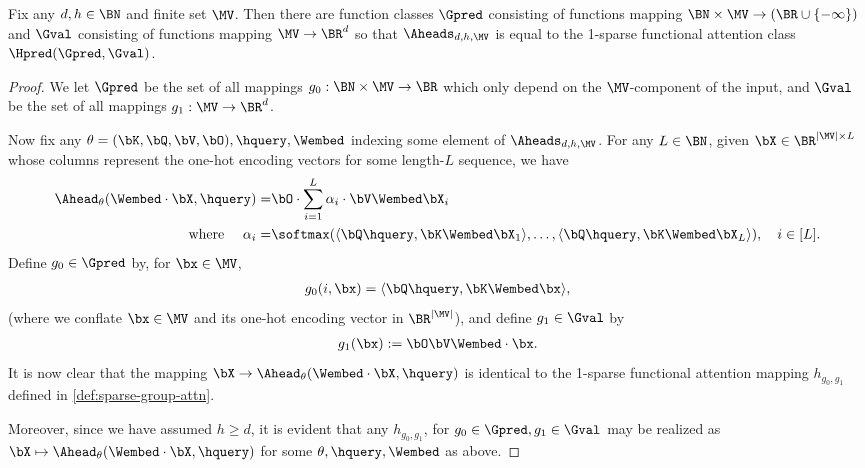 \documentclass{article}
\begin{document}
\begin{proposition}
  \label{prop:model-attn-head-formal}
  Fix any $d,h \in \BN$ and finite set $\MV$. Then there are function classes $\Gpred$ consisting of functions mapping $\BN \times \MV \to (\BR \cup \{ -\infty \})$ and $\Gval$ consisting of functions mapping $\MV \to \BR^d$ so that $\Aheads_{d,h,\MV} $ is equal to the 1-sparse functional attention class $\Hpred(\Gpred, \Gval)$. 
\end{proposition}
\begin{proof}
  We let $\Gpred$ be the set of all mappings $g_0 : \BN \times \MV \to \BR$ which only depend on the $\MV$-component of the input, and $\Gval$ be the set of all mappings $g_1 : \MV \to \BR^d$. 

  Now fix any $\theta = (\bK, \bQ, \bV, \bO), \hquery, \Wembed$ indexing some element of $\Aheads_{d,h,\MV}$. For any $L \in \BN$, given $\bX \in \BR^{|\MV| \times L}$ whose columns represent the one-hot encoding vectors for some length-$L$ sequence, we have
  \begin{align}
    \Ahead_\theta(\Wembed \cdot \bX, \hquery) = & \bO \cdot \sum_{i=1}^L \alpha_i \cdot \bV  \Wembed  \bX_i \nonumber\\
\mbox{ where } \quad     \alpha_i =&  \softmax(\langle \bQ \hquery, \bK \Wembed \bX_1 \rangle, \ldots, \langle \bQ \hquery, \bK \Wembed \bX_L \rangle), \quad i \in [L]\nonumber.
  \end{align}
  Define $g_0 \in \Gpred$ by, for $\bx \in \MV$,
  \begin{align}
g_0(i, \bx) = \langle \bQ \hquery, \bK \Wembed \bx \rangle\nonumber,
  \end{align}
(where we conflate $\bx \in \MV$ and its one-hot encoding vector in $\BR^{|\MV|}$),  and define $g_1 \in \Gval$ by
  \begin{align}
g_1(\bx) := \bO\bV \Wembed \cdot \bx\nonumber.
  \end{align}
  It is now clear that the mapping $\bX \to \Ahead_\theta(\Wembed \cdot \bX, \hquery)$ is identical to the 1-sparse functional attention mapping $h_{g_0, g_1}$ defined in \cref{def:sparse-group-attn}.

  Moreover, since we have assumed $h \geq d$, it is evident that any $h_{g_0, g_1}$, for $g_0 \in \Gpred, g_1 \in \Gval$ may be realized as $\bX \mapsto \Ahead_\theta(\Wembed \cdot \bX, \hquery)$ for some $\theta, \hquery, \Wembed$ as above. 
\end{proof}
\end{document}
